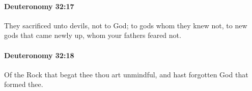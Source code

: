 		\paragraph{Deuteronomy 32:17} %
			\label{DEUTERONOMY-32-17}

			They sacrificed unto devils, not to God; to gods whom they knew not, to new gods that came newly up, whom your fathers feared not.


		\paragraph{Deuteronomy 32:18} %
			\label{DEUTERONOMY-32-18}

			Of the Rock that begat thee thou art unmindful, and hast forgotten God that formed thee.


